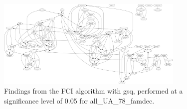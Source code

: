 \begin{figure}[htbp]
    \centering
    \includegraphics[width=0.8\textwidth]{Report/final_report/pictures/FCI_gsq_0.05_all_UA_78_famdec.png}
    \caption{Findings from the FCI algorithm with gsq, performed at a significance level of 0.05 for all_UA_78_famdec.}
    \label{fig:fci_gsq_0.05all_UA_78_famdec}
\end{figure}
